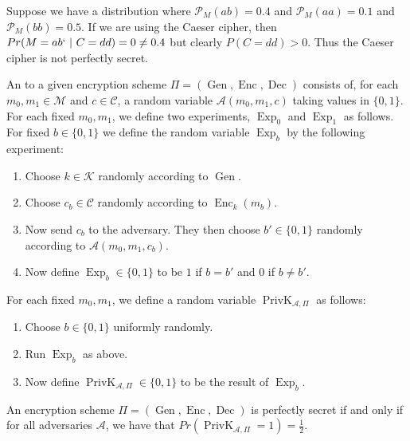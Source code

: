 \documentclass[twoside, a4paper, 10pt]{amsart}
\begin{document}
\begin{eg} Suppose we have a distribution where $\mathcal{P}_M(ab) = 0.4$ and $\mathcal{P}_M(aa) = 0.1$ and $\mathcal{P}_M(bb) = 0.5$. If we are using the Caeser cipher, then $Pr(M = ab `~|~ C = dd) = 0 \neq 0.4$ but clearly $P(C=dd) >0$. Thus the Caeser cipher is not perfectly secret.  

\end{eg}

\begin{mydef}[Adversary] An  to a given encryption scheme $\Pi = (\operatorname{Gen}, \operatorname{Enc}, \operatorname{Dec})$ consists of, for each $m_0,m_1 \in \mathcal{M}$ and $c \in \mathcal{C}$, a random variable $\mathcal{A}(m_0, m_1, c)$ taking values in $\{0,1\}$. For each fixed $m_0,m_1$, we define two experiments, $\operatorname{Exp}_0$ and $\operatorname{Exp}_1$ as follows. For fixed $b \in \{0,1\}$ we define the random variable $\operatorname{Exp}_b$ by the following experiment:

\begin{enumerate}
	\item Choose $k \in \mathcal{K}$ randomly according to $\operatorname{Gen}$.
	\item Choose $c_b \in \mathcal{C}$ randomly according to $\operatorname{Enc}_k(m_b)$.
	\item Now send $c_b$ to the adversary. They then choose $b' \in \{0,1\}$ randomly according to $\mathcal{A}(m_0, m_1, c_b)$.
	\item Now define $\operatorname{Exp}_b \in \{0,1\}$ to be $1$ if $b = b'$ and $0$ if $b \neq b'$.
\end{enumerate}

 For each fixed $m_0,m_1$, we define a random variable $\operatorname{PrivK}_{\mathcal{A}, \Pi}$ as follows:

\begin{enumerate}
	\item Choose $b \in \{0,1\}$ uniformly randomly.
	\item Run $\operatorname{Exp}_b$ as above.
	\item Now define $\operatorname{PrivK}_{\mathcal{A}, \Pi} \in \{0,1\}$ to be the result of $\operatorname{Exp}_b$.

\end{enumerate}

\end{mydef}

\begin{prop} An encryption scheme $\Pi = (\operatorname{Gen}, \operatorname{Enc}, \operatorname{Dec})$ is perfectly secret if and only if for all adversaries $\mathcal{A}$, we have that $Pr(\operatorname{PrivK}_{\mathcal{A}, \Pi} = 1) = \frac{1}{2}. $

\end{prop}
\end{document}
